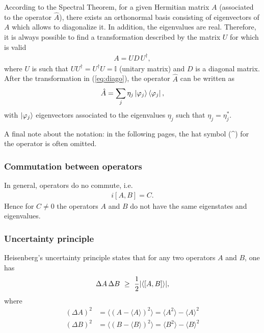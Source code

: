 According to the Spectral Theorem, for a given Hermitian matrix $A$ (associated to the operator $\hat{A}$), there exists an orthonormal basis consisting of eigenvectors of $A$ which allows to diagonalize it. In addition, the eigenvalues are real. Therefore, it is always possible to find a transformation described by the matrix $U$ for which is valid
\begin{align}
    \label{eq:diago}
    A = U D \, U^\dagger, 
\end{align}
where $U$ is such that ${U} {U}^\dagger = {U}^\dagger {U} = \mathbb{I}$ (unitary matrix) and $D$ is a diagonal matrix. After the transformation in (\ref{eq:diago}), the operator $\hat{A}$ can be written as 
\begin{align*}
    \hat{A} = \sum_j \eta_j \ket{\varphi_j} \bra{\varphi_j}, 
\end{align*}
with $\ket{\varphi_j}$ eigenvectors associated to the eigenvalues $\eta_j$ such that $\eta_j = \eta_j^*$. 
\newline

A final note about the notation: in the following pages, the hat symbol (\^{}) for the operator is often omitted.

\subsubsection{Commutation between operators}

In general, operators do no commute, i.e.
\begin{align*}
    i[A,B] = C. 
\end{align*}
Hence for $C \neq 0$ the operators $A$ and $B$ do not have the same eigenstates and eigenvalues. 

\subsubsection{Uncertainty principle}

Heisenberg's uncertainty principle states that for any two operators $A$ and $B$, one has 
\begin{align}
    \label{eq:unc_princ}
    \Delta A \, \Delta B ~\geq~ \frac{1}{2} \abs{\langle [A,B] \rangle}, 
\end{align}
where
\begin{align*}
    (\Delta A)^2 &= {\langle \left( A - \langle A \rangle \right)^2\rangle } = {\langle A^2 \rangle - \langle A \rangle^2} \\
    (\Delta B)^2 &= {\langle \left( B - \langle B \rangle \right)^2\rangle } = {\langle B^2 \rangle - \langle B \rangle^2} 
\end{align*}

